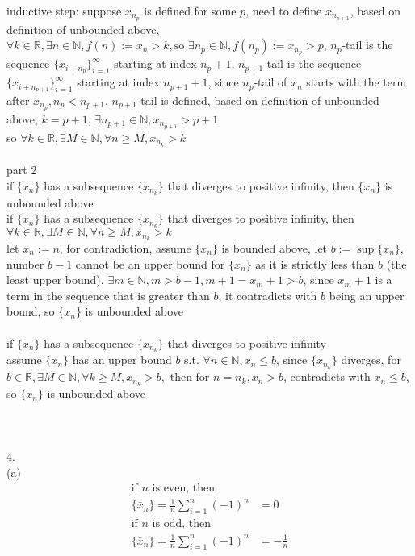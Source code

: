 \documentclass[12pt, border = 4pt, multi]{article} %
\begin{document}
inductive step: suppose $x_{n_p}$ is defined for some $p$, need to define $x_{n_{p + 1}}$, based on definition of unbounded above, $\forall k \in \mathbb{R}, \exists n \in \mathbb{N}, f(n) := x_n > k, \text{so }\exists n_p \in \mathbb{N}, f(n_p) := x_{n_p} > p$, $n_p$-tail is the sequence $\{x_{i + n_p}\}_{i = 1} ^ {\infty}$ starting at index $n_p + 1$, $n_{p + 1}$-tail is the sequence $\{x_{i + n_{p + 1}}\}_{i = 1} ^ {\infty}$ starting at index $n_{p + 1} + 1$, since $n_p$-tail of $x_n$ starts with the term after $x_{n_p}, n_p < n_{p + 1}$, $n_{p + 1}$-tail is defined, based on definition of unbounded above, $k = p + 1$, $\exists n_{p + 1} \in \mathbb{N}, x_{n_{p + 1}} > p + 1$\\
so $\forall k \in \mathbb{R}, \exists M \in \mathbb{N}, \forall n \geq M, x_{n_k} > k$\\
\\
part 2\\
if $\{x_n\}$ has a subsequence $\{x_{n_k}\}$ that diverges to positive infinity, then $\{x_n\}$ is unbounded above\\
if $\{x_n\}$ has a subsequence $\{x_{n_k}\}$ that diverges to positive infinity, then\\
$\forall k \in \mathbb{R}, \exists M \in \mathbb{N}, \forall n \geq M, x_{n_k} > k$\\
let $x_n := n$, for contradiction, assume $\{x_n\}$ is bounded above, let $b := \sup\{x_n\}$, number $b - 1$ cannot be an upper bound for $\{x_n\}$ as it is strictly less than $b$ (the least upper bound). $\exists m \in \mathbb{N}, m > b - 1, m + 1 = x_m + 1 > b$, since $x_m + 1$ is a term in the sequence that is greater than $b$, it contradicts with $b$ being an upper bound, so $\{x_n\}$ is unbounded above\\
\\
if $\{x_n\}$ has a subsequence $\{x_{n_k}\}$ that diverges to positive infinity\\
assume $\{x_n\}$ has an upper bound $b$ s.t. $\forall n \in \mathbb{N}, x_n \leq b$, since $\{x_{n_k}\}$ diverges, for $b \in \mathbb{R}, \exists M \in \mathbb{N}, \forall k \geq M, x_{n_k} > b,$ then for $n = n_k, x_n > b$, contradicts with $x_n \leq b$, so $\{x_n\}$ is unbounded above\\
\\
\\
\\
4.\\
(a)
\begin{align*}
\text{if } n \text{ is even, then }\\
\{\bar{x}_n\} = \frac{1}{n}\sum_{i = 1} ^ n (-1) ^ n &= 0\\
\text{if } n \text{ is odd, then }\\
\{\bar{x}_n\} = \frac{1}{n}\sum_{i = 1} ^ n (-1) ^ n &= -\frac{1}{n}\\ 
\end{align*}
\end{document}
